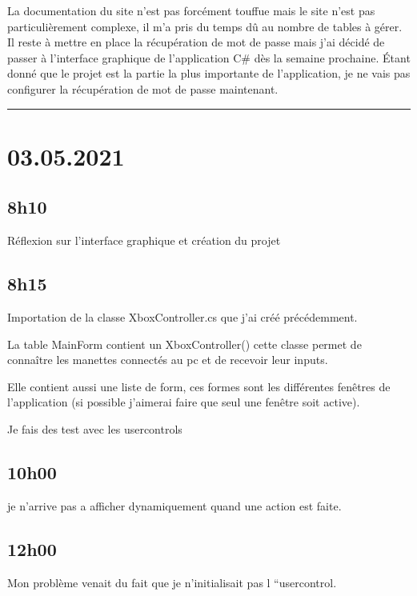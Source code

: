 \documentclass[a4paper,12pt,french]{sphinxmanual}
\begin{document}
\sphinxAtStartPar
La documentation du site n’est pas forcément touffue mais le site n’est pas particulièrement complexe, il m’a pris du temps dû au nombre de tables à gérer. Il reste à mettre en place la récupération de mot de passe mais j’ai décidé de passer à l’interface graphique de l’application C\# dès la semaine prochaine. Étant donné que le projet est la partie la plus importante de l’application, je ne vais pas configurer la récupération de mot de passe maintenant.


\bigskip\hrule\bigskip



\section{03.05.2021}
\label{\detokenize{logbook:id59}}

\subsection{8h10}
\label{\detokenize{logbook:id60}}
\sphinxAtStartPar
Réflexion sur l’interface graphique et création du projet


\subsection{8h15}
\label{\detokenize{logbook:id61}}
\sphinxAtStartPar
Importation de la classe XboxController.cs que j’ai créé précédemment.

\sphinxAtStartPar
{}

\sphinxAtStartPar
La table MainForm contient un XboxController() cette classe permet de connaître les manettes connectés au pc et de recevoir leur inputs.

\sphinxAtStartPar
Elle contient aussi une liste de form, ces formes sont les différentes fenêtres de l’application (si possible j’aimerai faire que seul une fenêtre soit active).

\sphinxAtStartPar
Je fais des test avec les usercontrols


\subsection{10h00}
\label{\detokenize{logbook:id62}}
\sphinxAtStartPar
je n’arrive pas a afficher dynamiquement quand une action est faite.


\subsection{12h00}
\label{\detokenize{logbook:id63}}
\sphinxAtStartPar
Mon problème venait du fait que je n’initialisait pas l “usercontrol.
\end{document}
